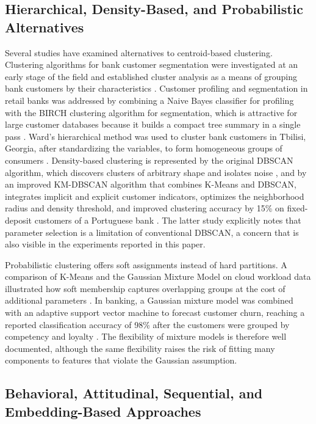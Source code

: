 \documentclass[conference]{IEEEtran}
\begin{document}
\subsection{Hierarchical, Density-Based, and Probabilistic Alternatives}

Several studies have examined alternatives to centroid-based clustering. Clustering algorithms for bank customer segmentation were investigated at an early stage of the field and established cluster analysis as a means of grouping bank customers by their characteristics \cite{zakrzewska2005clustering}. Customer profiling and segmentation in retail banks was addressed by combining a Naive Bayes classifier for profiling with the BIRCH clustering algorithm for segmentation, which is attractive for large customer databases because it builds a compact tree summary in a single pass \cite{hassan2018}. Ward's hierarchical method was used to cluster bank customers in Tbilisi, Georgia, after standardizing the variables, to form homogeneous groups of consumers \cite{kikoria2020}. Density-based clustering is represented by the original DBSCAN algorithm, which discovers clusters of arbitrary shape and isolates noise \cite{ester1996density}, and by an improved KM-DBSCAN algorithm that combines K-Means and DBSCAN, integrates implicit and explicit customer indicators, optimizes the neighborhood radius and density threshold, and improved clustering accuracy by 15\% on fixed-deposit customers of a Portuguese bank \cite{yan2025}. The latter study explicitly notes that parameter selection is a limitation of conventional DBSCAN, a concern that is also visible in the experiments reported in this paper.

Probabilistic clustering offers soft assignments instead of hard partitions. A comparison of K-Means and the Gaussian Mixture Model on cloud workload data illustrated how soft membership captures overlapping groups at the cost of additional parameters \cite{patel2020clustering}. In banking, a Gaussian mixture model was combined with an adaptive support vector machine to forecast customer churn, reaching a reported classification accuracy of 98\% after the customers were grouped by competency and loyalty \cite{saxena2023}. The flexibility of mixture models is therefore well documented, although the same flexibility raises the risk of fitting many components to features that violate the Gaussian assumption.

\subsection{Behavioral, Attitudinal, Sequential, and Embedding-Based Approaches}
\end{document}
